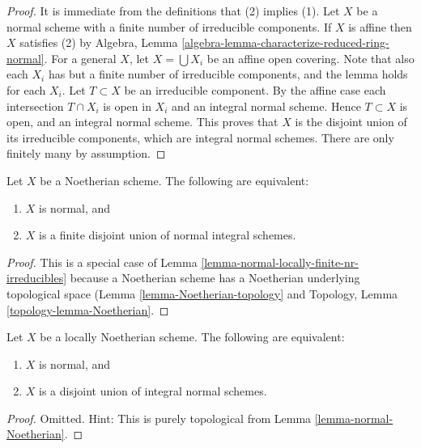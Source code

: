\begin{proof}
It is immediate from the definitions that (2) implies (1).
Let $X$ be a normal scheme with a finite number of irreducible components.
If $X$ is affine then $X$ satisfies (2) by
Algebra, Lemma \ref{algebra-lemma-characterize-reduced-ring-normal}.
For a general $X$, let $X = \bigcup X_i$ be
an affine open covering. Note that also each $X_i$ has
but a finite number of irreducible components, and the lemma holds
for each $X_i$. Let $T \subset X$ be an irreducible component.
By the affine case each intersection $T \cap X_i$ is open in $X_i$
and an integral normal scheme.
Hence $T \subset X$ is open, and an integral normal scheme.
This proves that $X$ is the disjoint union of its irreducible components,
which are integral normal schemes. There are only finitely many
by assumption.
\end{proof}

\begin{lemma}
\label{lemma-normal-Noetherian}
Let $X$ be a Noetherian scheme.
The following are equivalent:
\begin{enumerate}
\item $X$ is normal, and
\item $X$ is a finite disjoint union of normal integral schemes.
\end{enumerate}
\end{lemma}

\begin{proof}
This is a special case of
Lemma \ref{lemma-normal-locally-finite-nr-irreducibles} because a Noetherian
scheme has a Noetherian underlying topological space
(Lemma \ref{lemma-Noetherian-topology}
and
Topology, Lemma \ref{topology-lemma-Noetherian}.
\end{proof}

\begin{lemma}
\label{lemma-normal-locally-Noetherian}
Let $X$ be a locally Noetherian scheme.
The following are equivalent:
\begin{enumerate}
\item $X$ is normal, and
\item $X$ is a disjoint union of integral normal schemes.
\end{enumerate}
\end{lemma}

\begin{proof}
Omitted. Hint: This is purely topological from
Lemma \ref{lemma-normal-Noetherian}.
\end{proof}

